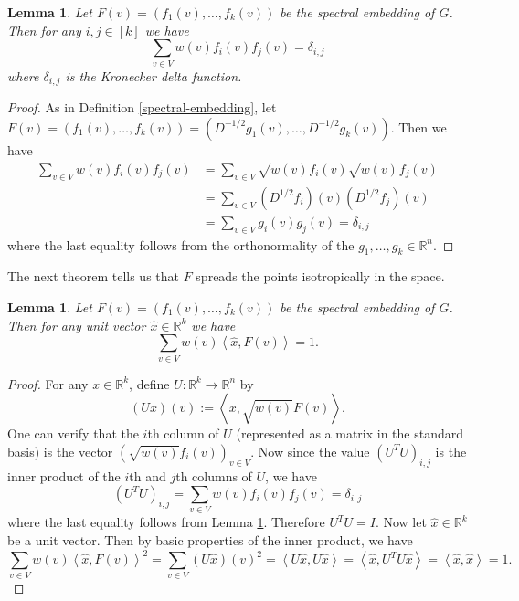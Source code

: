 \documentclass[a4paper,11pt]{article}
\newtheorem{lemma}[theorem]{Lemma}
\theoremstyle{definition}
\newcommand{\R}{\mathbb{R}}
\newcommand{\inner}[2]{\left\langle #1, #2 \right\rangle}
\begin{document}
\begin{lemma}\label{orthonormal-eigenvectors-embedding}
Let $F(v) = (f_1(v), \dots, f_k(v))$ be the spectral embedding of $G$. Then for any $i, j \in [k]$ we have
\[
\sum_{v \in V} w(v)f_i(v)f_j(v) = \delta_{i,j}
\]
where $\delta_{i, j}$ is the Kronecker delta function.
\end{lemma}
\begin{proof}
As in Definition \ref{spectral-embedding}, let $F(v) = (f_1(v), \dots, f_k(v)) = (D^{-1/2}g_1(v), \dots, D^{-1/2}g_k(v))$. Then we have
\begin{align*}
\sum_{v \in V} w(v)f_i(v)f_j(v) &= \sum_{v \in V} \sqrt{w(v)}f_i(v)\sqrt{w(v)}f_j(v) \\
&= \sum_{v \in V} (D^{1/2}f_i)(v)(D^{1/2}f_j)(v) \\
&= \sum_{v \in V} g_i(v)g_j(v) = \delta_{i,j}
\end{align*}
where the last equality follows from the orthonormality of the $g_1, \dots, g_k \in \R^n$.
\end{proof}

The next theorem tells us that $F$ spreads the points isotropically in the space.

\begin{lemma}\label{unit_vec_mass}
Let $F(v) = (f_1(v), \dots, f_k(v))$ be the spectral embedding of $G$. Then for any unit vector $\hat{x} \in \R^k$ we have
\[
\sum_{v \in V} w(v) \inner{\hat{x}}{F(v)} = 1.
\]
\end{lemma}
\begin{proof}
For any $x \in \R^k$, define $U: \R^k  \to \R^n$ by
\[
(Ux)(v) := \inner{x}{\sqrt{w(v)}F(v)}.
\]
One can verify that the $i$th column of $U$ (represented as a matrix in the standard basis) is the vector $(\sqrt{w(v)}f_i(v))_{v \in V}$. Now since the value $(U^TU)_{i,j}$ is the inner product of the $i$th and $j$th columns of $U$, we have
\[
(U^TU)_{i,j} = \sum_{v \in V} w(v)f_i(v)f_j(v) = \delta_{i,j}
\] where the last equality follows from Lemma \ref{orthonormal-eigenvectors-embedding}. Therefore $U^TU = I$. Now let $\hat{x} \in \R^k$ be a unit vector. Then by basic properties of the inner product, we have
\[
\sum_{v \in V}w(v)\inner{\hat{x}}{F(v)}^2 = \sum_{v \in V} (U\hat{x})(v)^2 = \inner{U\hat{x}}{U\hat{x}} = \inner{\hat{x}}{U^TU\hat{x}} = \inner{\hat{x}}{\hat{x}} = 1.
\]
\end{proof}
\end{document}
